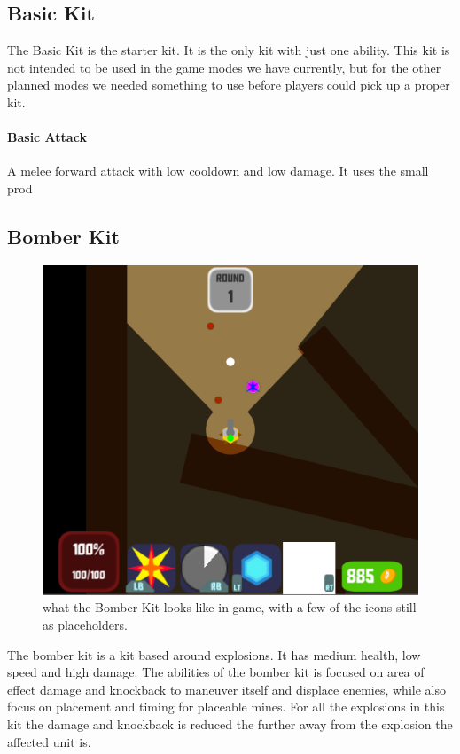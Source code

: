 \subsection{Basic Kit}
The Basic Kit is the starter kit. It is the only kit with just one ability. This kit is not intended to be used in the game modes we have currently, but for the other planned modes we needed something to use before players could pick up a proper kit.

\paragraph{Basic Attack}
A melee forward attack with low cooldown and low damage. It uses the small prod

\subsection{Bomber Kit}
\begin{figure}[tbph]  %
  \centering
  \includegraphics[width=.75\textwidth]{images/BomberKitMinesPlaced}
  \caption[Screenshot of Bomber Kit with mines placed]{what the Bomber Kit looks like in game, with a few of the icons still as placeholders.}
  \label{fig:BomberKitMines}
\end{figure}
The bomber kit is a kit based around explosions. It has medium health, low speed and high damage. The abilities of the bomber kit is focused on area of effect damage and knockback to maneuver itself and displace enemies, while also focus on placement and timing for placeable mines. For all the explosions in this kit the damage and knockback is reduced the further away from the explosion the affected unit is.

